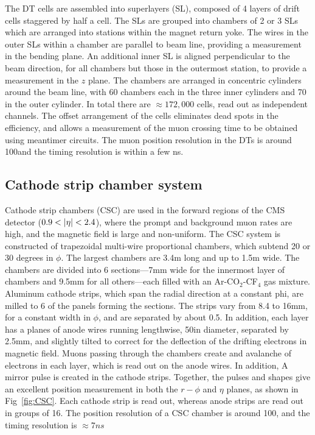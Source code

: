 The DT cells are assembled into superlayers (SL), composed of 
4 layers of drift cells staggered by half a cell. 
The SLs are grouped into chambers of 2 or 3 SLs which are arranged into stations
within the magnet return yoke.
The wires in the outer SLs within a chamber are parallel to beam line, providing
a measurement in the bending plane.
An additional inner SL is aligned perpendicular to the beam direction, 
for all chambers but those in the 
outermost station, to provide a measurement in the $z$ plane. 
The chambers are arranged in concentric cylinders
around the beam line, with 60 chambers each in the three inner cylinders
and 70 in the outer cylinder. In total there are $\approx172,000$ 
cells, read out as independent channels. The offset arrangement of the cells
eliminates dead spots in the efficiency, and allows a measurement of the
muon crossing time to be obtained using meantimer circuits.
The muon position resolution in the DTs is around 100\micron and the
timing resolution is within a few ns.

\subsection{Cathode strip chamber system}

Cathode strip chambers (CSC) are used in
the forward regions of the CMS detector ($0.9 < \lvert \eta \rvert < 2.4$), 
where the prompt and background muon rates are high, and the magnetic field
is large and non-uniform. The CSC system is constructed of trapezoidal
multi-wire proportional chambers,
which subtend 20 or 30 degrees in $\phi$. The largest chambers are 3.4\unit{m}
long and up to 1.5\unit{m} wide. The chambers are divided into 6 sections---7\unit{mm} 
wide for the innermost layer of chambers and 9.5\unit{mm} for all 
others---each filled with an Ar-CO$_2$-CF$_4$ gas mixture. Aluminum cathode strips,
which span the radial direction at a constant phi, 
are milled to 6 of the panels forming the sections. The strips vary from
8.4 to 16\unit{mm}, for a constant width in $\phi$, and are separated by about 0.5\mm. 
In addition, each layer has a planes of anode wires running lengthwise, 
50\micron in diameter, separated by 2.5\unit{mm}, and slightly tilted to correct
for the deflection of the drifting electrons in magnetic field.
Muons passing through the chambers create and avalanche
of electrons in each layer, which is read out on the anode wires. In addition,
A mirror pulse is created in the cathode strips.
Together, the pulses and shapes give an excellent position measurement 
in both the $r-\phi$ and $\eta$ planes, as shown in Fig~\ref{fig:CSC}.
Each cathode strip is read out, whereas anode strips are read out in
groups of 16. The position resolution of a CSC chamber is around
100\micron, and the timing resolution is $\approx7\unit{ns}$

